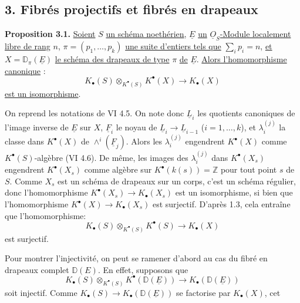 
\subsection*{3. Fibrés projectifs et fibrés en drapeaux}

\textbf{Proposition 3.1.} \uline{Soient} $S$ \uline{un schéma noethérien}, $\underline{E}$ \uline{un} $\underline{O}_S$\uline{-Module localement libre de rang} $n$, $\pi=(p_1,\ldots,p_k)$ \uline{une suite d'entiers tels que} $\sum_i p_i=n$, \uline{et} $X=\mathbb D_\pi(\underline{E})$ \uline{le schéma des drapeaux de type} $\pi$ \uline{de} $\underline{E}$. \uline{Alors l'homomorphisme canonique} :
\[
K_\bullet(S)\otimes_{K^{\bullet}(S)}K^{\bullet}(X)\longrightarrow K_\bullet(X)
\]
\uline{est un isomorphisme}.

On reprend les notations de VI 4.5. On note donc $\underline{L}_i$ les quotients canoniques de l'image inverse de $\underline{E}$ sur $X$, $\underline{F}_i$ le noyau de $\underline{L}_i\to \underline{L}_{i-1}$ ($i=1,\ldots,k$), et $\lambda_i^{(j)}$ la classe dans $K^{\bullet}(X)$ de $\wedge^i(\underline{F}_j)$. Alors les $\lambda_i^{(j)}$ engendrent $K^{\bullet}(X)$ comme $K^{\bullet}(S)$-algèbre (VI 4.6). De même, les images des $\lambda_i^{(j)}$ dans $K^{\bullet}(X_s)$ engendrent $K^{\bullet}(X_s)$ comme algèbre sur $K^{\bullet}(k(s))=\mathbb Z$ pour tout point $s$ de $S$. Comme $X_s$ est un schéma de drapeaux sur un corps, c'est un schéma régulier, donc l'homomorphisme $K^{\bullet}(X_s)\to K_\bullet(X_s)$ est un isomorphisme, si bien que l'homomorphisme $K^{\bullet}(X)\to K_\bullet(X_s)$ est surjectif. D'après 1.3, cela entraîne que l'homomorphisme:
\[
K_\bullet(S)\otimes_{K^{\bullet}(S)}K^{\bullet}(S)\longrightarrow K_\bullet(X)
\]
est surjectif.

Pour montrer l'injectivité, on peut se ramener d'abord au cas du fibré en drapeaux complet $\mathbb D(E)$. En effet, supposons que
\[
K_\bullet(S)\otimes_{K^{\bullet}(S)}K^{\bullet}(\mathbb D(\underline{E}))\longrightarrow K_\bullet(\mathbb D(\underline{E}))
\]
soit injectif. Comme $K_\bullet(S)\to K_\bullet(\mathbb D(\underline{E}))$ se factorise par $K_\bullet(X)$, cet
